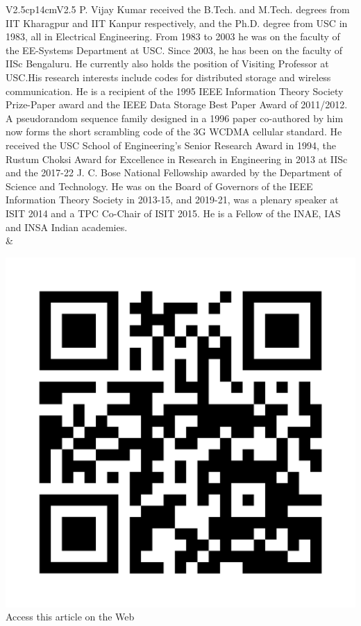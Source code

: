 \begin{tabular}{V{2.5}cp{14cm}V{2.5}}
\bigskip
P. Vijay Kumar received the B.Tech. and M.Tech. degrees from IIT Kharagpur and IIT Kanpur respectively, and the Ph.D. degree from USC in 1983, all in Electrical Engineering. From 1983 to 2003 he was on the faculty of the EE-Systems Department at USC. Since 2003, he has been on the faculty of IISc Bengaluru. He currently also holds the position of Visiting Professor at USC.\break\break His research interests include codes for distributed storage and wireless communication. He is a recipient of the 1995 IEEE Information Theory Society Prize-Paper award and the IEEE Data Storage Best Paper Award of 2011/2012.  A pseudorandom sequence family designed in a 1996 paper co-authored by him now forms the short scrambling code of the 3G WCDMA cellular standard.   He received the USC School of Engineering’s Senior Research Award in 1994, the Rustum Choksi Award for Excellence in Research in Engineering in 2013 at IISc and the 2017-22 J. C. Bose National Fellowship awarded by the Department of Science and Technology.  He was on the Board of Governors of the IEEE Information Theory Society in 2013-15, and 2019-21, was a plenary speaker at ISIT 2014 and a TPC Co-Chair of ISIT 2015.  He is a Fellow of the INAE, IAS and INSA Indian academies.\\
&\\
\end{tabular}




\begin{center}
\includegraphics{src/Figures/erasure_coding_QR.png}\\
{\sf Access this article on the Web}
\end{center}







 

